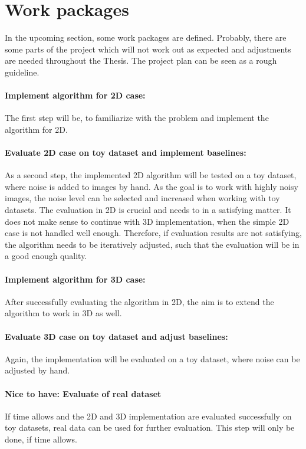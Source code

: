 \section{Work packages}
In the upcoming section, some work packages are defined.
Probably, there are some parts of the project which will not work out as expected and 
adjustments are needed throughout the Thesis.
The project plan can be seen as a rough guideline.

\paragraph{Implement algorithm for 2D case:}
The first step will be, to familiarize with the problem and implement
the algorithm for 2D. 

\paragraph{Evaluate 2D case on toy dataset and implement baselines:}
As a second step, the implemented 2D algorithm will be tested on a toy dataset,
where noise is added to images by hand. As the goal is to work with highly noisy images,
the noise level can be selected and increased when working with toy datasets. 
The evaluation in 2D is crucial and needs to in a satisfying matter. 
It does not make sense to continue with 3D implementation, when the simple 2D case is not handled well enough.
Therefore, if evaluation results are not satisfying, the algorithm needs to be iteratively adjusted, 
such that the evaluation will be in a good enough quality.


\paragraph{Implement algorithm for 3D case:}
After successfully evaluating the algorithm in 2D, the aim is to extend the algorithm to work in 3D as well.

\paragraph{Evaluate 3D case on toy dataset and adjust baselines:}
Again, the implementation will be evaluated on a toy dataset, where noise can be adjusted by hand.


\paragraph{Nice to have: Evaluate of real dataset}
If time allows and the 2D and 3D implementation are evaluated successfully on toy datasets, 
real data can be used for further evaluation. This step will only be done, if time allows.


